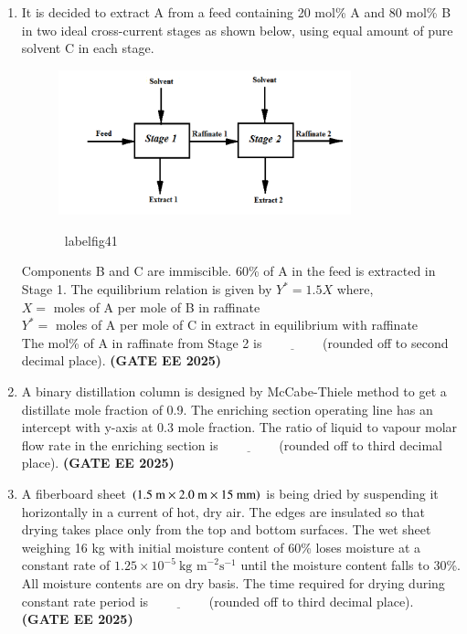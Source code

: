 \documentclass[journal,12pt,onecolumn]{IEEEtran}
\theoremstyle{remark}
\begin{document}
\begin{enumerate}
\item It is decided to extract A from a feed containing 20 mol\% A and 80 mol\% B in two ideal cross-current stages as shown below, using equal amount of pure solvent C in each stage.
	\begin{figure}
\begin{center}
\includegraphics[width=0.8\textwidth]{figs/41.png}
     \caption{}
      \ label{fig41}
\end{center}
	\end{figure}
Components B and C are immiscible. 60\% of A in the feed is extracted in Stage 1. The equilibrium relation is given by $Y^{*}=1.5 X$ where, \\
$X=$ moles of A per mole of B in raffinate \\
$Y^{*}=$ moles of A per mole of C in extract in equilibrium with raffinate
\\
The mol\% of A in raffinate from Stage 2 is$\underline{\hspace{2cm}}$(rounded off to second decimal place). \hfill \textbf{(GATE EE 2025)} 



\item A binary distillation column is designed by McCabe-Thiele method to get a distillate mole fraction of 0.9. The enriching section operating line has an intercept with y-axis at 0.3 mole fraction. The ratio of liquid to vapour molar flow rate in the enriching section is$\underline{\hspace{2cm}}$(rounded off to third decimal place). \hfill \textbf{(GATE EE 2025)} 



\item A fiberboard sheet $\left(1.5~\text{m}\times2.0~\text{m}\times15~\text{mm}\right)$ is being dried by suspending it horizontally in a current of hot, dry air. The edges are insulated so that drying takes place only from the top and bottom surfaces. The wet sheet weighing 16 kg with initial moisture content of 60\% loses moisture at a constant rate of $1.25\times10^{-5}~\text{kg m}^{-2}\text{s}^{-1}$ until the moisture content falls to 30\%. All moisture contents are on dry basis. The time required for drying during constant rate period  is$\underline{\hspace{2cm}}$(rounded off to third decimal place). \hfill \textbf{(GATE EE 2025)} 




\end{enumerate}
\end{document}
